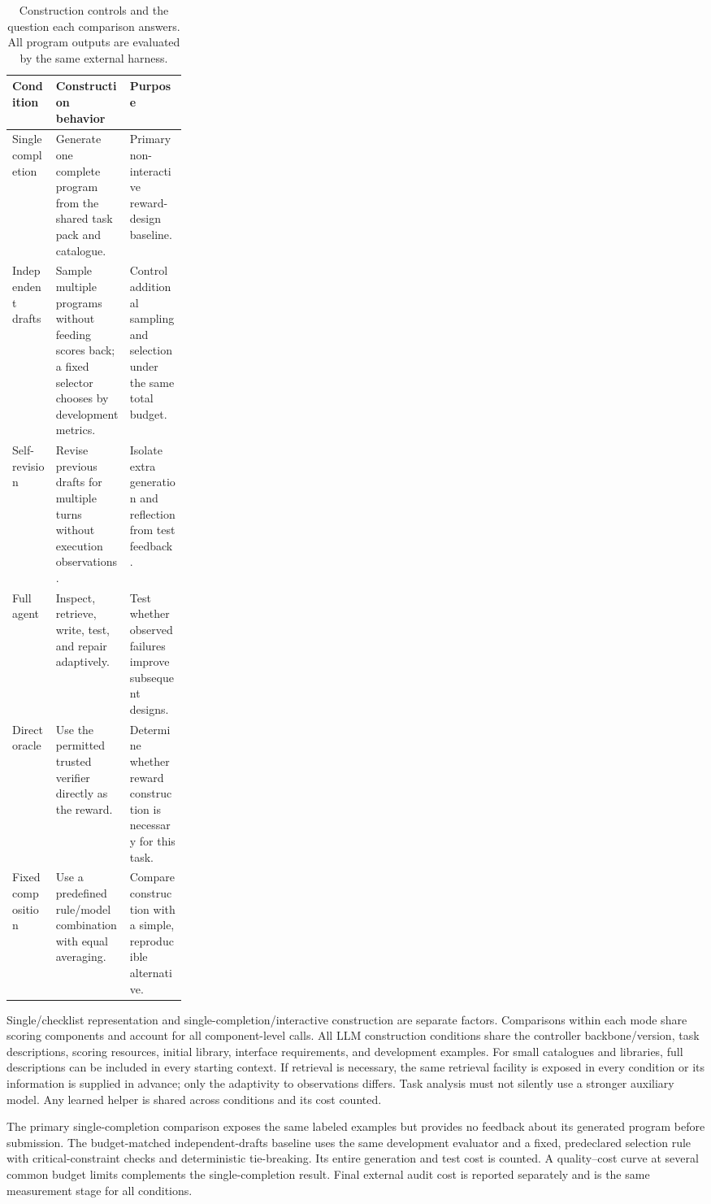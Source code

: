 \begin{table}[ht]
\centering
\caption{Construction controls and the question each comparison answers. All program outputs are evaluated by the same external harness.}
\small
\begin{tabularx}{\linewidth}{@{}p{0.25\linewidth}XX@{}}
\toprule
\textbf{Condition} & \textbf{Construction behavior} & \textbf{Purpose} \\
\midrule
Single completion & Generate one complete program from the shared task pack and catalogue. & Primary non-interactive reward-design baseline. \\
Independent drafts & Sample multiple programs without feeding scores back; a fixed selector chooses by development metrics. & Control additional sampling and selection under the same total budget. \\
Self-revision & Revise previous drafts for multiple turns without execution observations. & Isolate extra generation and reflection from test feedback. \\
Full agent & Inspect, retrieve, write, test, and repair adaptively. & Test whether observed failures improve subsequent designs. \\
Direct oracle & Use the permitted trusted verifier directly as the reward. & Determine whether reward construction is necessary for this task. \\
Fixed composition & Use a predefined rule/model combination with equal averaging. & Compare construction with a simple, reproducible alternative. \\
\bottomrule
\end{tabularx}
\end{table}

Single/checklist representation and single-completion/interactive construction are separate factors. Comparisons within each mode share scoring components and account for all component-level calls. All LLM construction conditions share the controller backbone/version, task descriptions, scoring resources, initial library, interface requirements, and development examples. For small catalogues and libraries, full descriptions can be included in every starting context. If retrieval is necessary, the same retrieval facility is exposed in every condition or its information is supplied in advance; only the adaptivity to observations differs. Task analysis must not silently use a stronger auxiliary model. Any learned helper is shared across conditions and its cost counted.

The primary single-completion comparison exposes the same labeled examples but provides no feedback about its generated program before submission. The budget-matched independent-drafts baseline uses the same development evaluator and a fixed, predeclared selection rule with critical-constraint checks and deterministic tie-breaking. Its entire generation and test cost is counted. A quality--cost curve at several common budget limits complements the single-completion result. Final external audit cost is reported separately and is the same measurement stage for all conditions.


